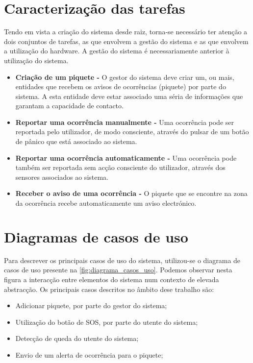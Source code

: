 \section{Caracterização das tarefas}

Tendo em vista a criação do sistema desde raiz, torna-se necessário ter atenção a dois conjuntos de tarefas, as que envolvem a gestão do sistema e as que envolvem a utilização do hardware. A gestão do sistema é necessariamente anterior à utilização do sistema.
\begin{itemize}
	\item\textbf{Criação de um piquete -} O gestor do sistema deve criar um, ou mais, entidades que recebem os avisos de ocorrências (piquete) por parte do sistema. A esta entidade deve estar associado uma séria de informações que garantam a capacidade de contacto. 
	
	\item\textbf{Reportar uma ocorrência manualmente -} Uma ocorrência pode ser reportada pelo utilizador, de modo consciente, através do pulsar de um botão de pânico que está associado ao sistema.
	
	\item\textbf{Reportar uma ocorrência automaticamente -} Uma ocorrência pode também ser reportada sem acção consciente do utilizador, através dos sensores associados ao sistema. 
	
	\item\textbf{Receber o aviso de uma ocorrência -} O piquete que se encontre na zona da ocorrência recebe automaticamente um aviso electrónico.
	
\end{itemize}

\section{Diagramas de casos de uso}

Para descrever os principais casos de uso do sistema, utilizou-se o diagrama de casos de uso presente na \ref{fig:diagrama_casos_uso}. Podemos observar nesta figura a interacção entre elementos do sistema num contexto de
elevada abstracção. Os principais casos descritos no âmbito dese trabalho são:
\begin{itemize}
	\item Adicionar piquete, por parte do gestor do sistema;
	\item Utilização do botão de SOS, por parte do utente do sistema;
	\item Detecção de queda do utente do sistema;
	\item Envio de um alerta de ocorrência para o piquete;
\end{itemize}

